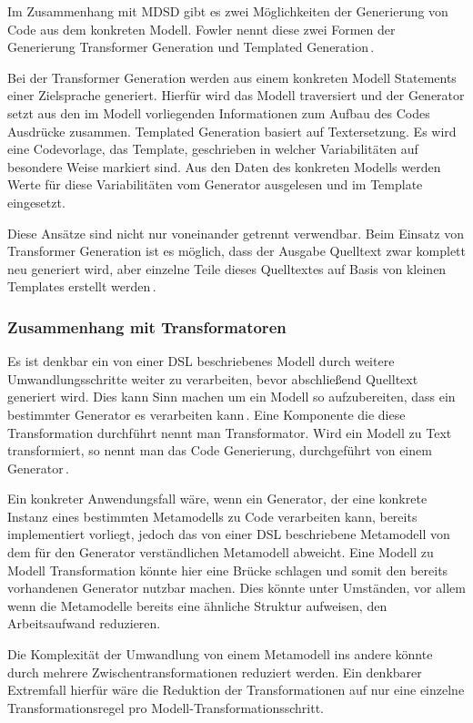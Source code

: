 \documentclass[12pt,oneside,a4paper,parskip]{scrbook}
\begin{document}
Im Zusammenhang mit MDSD gibt es zwei Möglichkeiten der Generierung von Code aus dem konkreten Modell. Fowler nennt diese zwei Formen der Generierung Transformer Generation und Templated Generation\,\cite[S. 124f.]{fowler2010}.

Bei der Transformer Generation werden aus einem konkreten Modell Statements einer Zielsprache generiert. Hierfür wird das Modell traversiert und der Generator setzt aus den im Modell vorliegenden Informationen zum Aufbau des Codes Ausdrücke zusammen. Templated Generation basiert auf Textersetzung. Es wird eine Codevorlage, das Template, geschrieben in welcher Variabilitäten auf besondere Weise markiert sind. Aus den Daten des konkreten Modells werden Werte für diese Variabilitäten vom Generator ausgelesen und im Template eingesetzt.

Diese Ansätze sind nicht nur voneinander getrennt verwendbar. Beim Einsatz von Transformer Generation ist es möglich, dass der Ausgabe Quelltext zwar komplett neu generiert wird, aber einzelne Teile dieses Quelltextes auf Basis von kleinen Templates erstellt werden\,\cite[S. 125]{fowler2010}.

\subsubsection{Zusammenhang mit Transformatoren}

Es ist denkbar ein von einer DSL beschriebenes Modell durch weitere Umwandlungsschritte weiter zu verarbeiten, bevor abschließend Quelltext generiert wird. Dies kann Sinn machen um ein Modell so aufzubereiten, dass ein bestimmter Generator es verarbeiten kann\,\cite[S. 195]{stahl2007}. Eine Komponente die diese Transformation durchführt nennt man Transformator. Wird ein Modell zu Text transformiert, so nennt man das Code Generierung, durchgeführt von einem Generator\,\cite[S. 271]{voelter2013}.

Ein konkreter Anwendungsfall wäre, wenn ein Generator, der eine konkrete Instanz eines bestimmten Metamodells zu Code verarbeiten kann, bereits implementiert vorliegt, jedoch das von einer DSL beschriebene Metamodell von dem für den Generator verständlichen Metamodell abweicht. Eine Modell zu Modell Transformation könnte hier eine Brücke schlagen und somit den bereits vorhandenen Generator nutzbar machen. Dies könnte unter Umständen, vor allem wenn die Metamodelle bereits eine ähnliche Struktur aufweisen, den Arbeitsaufwand reduzieren.

Die Komplexität der Umwandlung von einem Metamodell ins andere könnte durch mehrere Zwischentransformationen reduziert werden. Ein denkbarer Extremfall hierfür wäre die Reduktion der Transformationen auf nur eine einzelne Transformationsregel pro Modell-Transformationsschritt.
\end{document}
